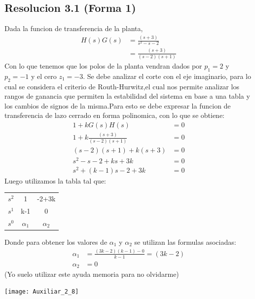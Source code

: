 \documentclass[
  11pt,
  letterpaper,
   addpoints,
   answers
  ]{exam}
\begin{document}
\begin{questions}
\begin{solution}
\subsection*{Resolucion 3.1 (Forma 1)}
Dada la funcion de transferencia de la planta,
\begin{align}
    H(s)G(s) &= \frac{(s+3)}{s^{2}-s-2}\\
             &= \frac{(s+3)}{(s-2)(s+1)}
\end{align}
Con lo que tenemos que los polos de la planta vendran dados por $p_{1} = 2$ y $p_{2} = -1$ y el cero $z_{1} = -3$. Se debe analizar el corte con el eje imaginario, para lo cual se considera el criterio de Routh-Hurwitz,el cual nos permite analizar los rangos de ganancia que permiten la estabilidad del sistema en base a una tabla y los cambios de signos de la misma.Para esto se debe expresar la funcion de transferencia de lazo cerrado en forma polinomica, con lo que se obtiene:
\begin{align}
    1+kG(s)H(s) &= 0\\
    1+k\frac{(s+3)}{(s-2)(s+1)} &= 0\\
    (s-2)(s+1)+k(s+3) &= 0\\
    s^{2}-s-2+ks+3k &= 0\\
    s^{2}+(k-1)s-2+3k &= 0
\end{align}
Luego utilizamos la tabla tal que:
\begin{center}
    \begin{tabular}{|c|cc|}
        \hline
        $s^{2}$ & 1 & -2+3k\\
        $s^{1}$ & k-1 & 0\\
        $s^{0}$ & $\alpha_{1}$ & $\alpha_{2}$\\
        \hline
    \end{tabular}
\end{center}
Donde para obtener los valores de $\alpha_{1}$ y $\alpha_{2}$ se utilizan las formulas asociadas:
\begin{align}
    \alpha_{1} &= \frac{(3k-2)(k-1)-0}{k-1} = (3k-2)\\
    \alpha_{2} &= 0
\end{align}
(Yo suelo utilizar este ayuda memoria para no olvidarme)
\begin{center}
    \texttt{[image: Auxiliar\_2\_8]}

\end{center}
\end{solution}
\end{questions}
\end{document}
